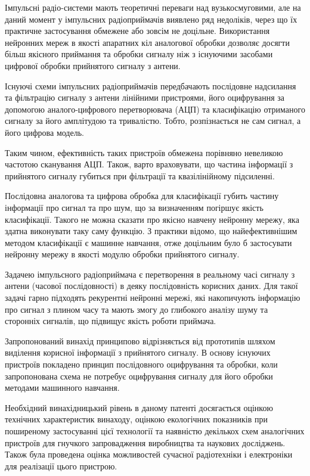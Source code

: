 Імпульсні радіо-системи мають теоретичні переваги над вузькосмуговими, 
але на даний момент у імпульсних радіоприймачів виявлено ряд недоліків, 
через що їх практичне застосування обмежене або зовсім не доцільне. 
Використання нейронних мереж в якості апаратних кіл аналогової обробки 
дозволяє досягти більш якісного приймання та обробки сигналу ніж з 
існуючими засобами цифрової обробки прийнятого сигналу з антени.

Існуючі схеми імпульсних радіоприймачів передбачають послідовне надсилання 
та фільтрацію сигналу з антени лінійними пристроями, його оцифрування за 
допомогою аналого-цифрового перетворювача (АЦП) та класифікацію отриманого 
сигналу за його амплітудою та тривалістю. Тобто, розпізнається не сам сигнал, 
а його цифрова модель.

Таким чином, ефективність таких пристроїв обмежена порівняно невеликою 
частотою сканування  АЦП. Також, варто враховувати, що частина інформації 
з прийнятого сигналу губиться при фільтрації та квазілінійному підсиленні.

Послідовна аналогова та цифрова обробка для класифікації губить частину 
інформації про сигнал та про шум, що за визначенням погіршує якість 
класифікації. Такого не можна сказати про якісно навчену нейронну мережу, 
яка здатна виконувати таку саму функцію. З практики відомо, що 
найефективнішим методом класифікації є машинне навчання, отже доцільним 
було б застосувати нейронну мережу в якості модулю обробки прийнятого 
сигналу. 

Задачею імпульсного радіоприймача є перетворення в реальному часі сигналу 
з антени (часової послідовності) в деяку послідовність корисних даних. 
Для такої задачі гарно підходять рекурентні нейронні мережі, які накопичують 
інформацію про сигнал з плином часу та мають змогу до глибокого аналізу шуму 
та сторонніх сигналів, що підвищує якість роботи приймача.

Запропонований винахід принципово відрізняється від прототипів шляхом 
виділення корисної інформації з прийнятого сигналу. В основу існуючих 
пристроїв покладено принцип послідовного оцифрування та обробки, коли запропонована схема не потребує оцифрування сигналу для його обробки 
методами машинного навчання.

Необхідний винахідницький рівень в даному патенті досягається оцінкою 
технічних характеристик винаходу, оцінкою екологічних показників при 
поширеному застосуванні цієї технології та наявністю декількох схем 
аналогічних пристроїв для гнучкого запровадження виробництва  та наукових 
досліджень. Також  була проведена оцінка можливостей сучасної радіотехніки 
і електроніки для реалізації цього пристрою.

